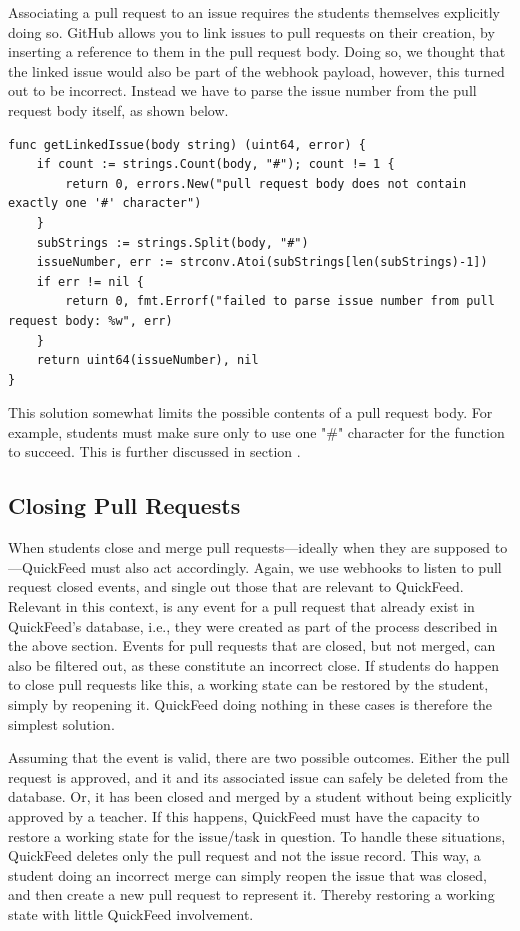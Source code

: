 Associating a pull request to an issue requires the students themselves explicitly doing so.
GitHub allows you to link issues to pull requests on their creation, by inserting a reference to them in the pull request body.
Doing so, we thought that the linked issue would also be part of the webhook payload, however, this turned out to be incorrect.
Instead we have to parse the issue number from the pull request body itself, as shown below.

\begin{lstlisting}[caption={The getLinkedIssue function}, language=Golang]
func getLinkedIssue(body string) (uint64, error) {
	if count := strings.Count(body, "#"); count != 1 {
		return 0, errors.New("pull request body does not contain exactly one '#' character")
	}
	subStrings := strings.Split(body, "#")
	issueNumber, err := strconv.Atoi(subStrings[len(subStrings)-1])
	if err != nil {
		return 0, fmt.Errorf("failed to parse issue number from pull request body: %w", err)
	}
	return uint64(issueNumber), nil
}
\end{lstlisting}

This solution somewhat limits the possible contents of a pull request body.
For example, students must make sure only to use one "\#" character for the function to succeed.
This is further discussed in section .%

\subsection{Closing Pull Requests}

When students close and merge pull requests---ideally when they are supposed to---QuickFeed must also act accordingly.
Again, we use webhooks to listen to pull request closed events, and single out those that are relevant to QuickFeed.
Relevant in this context, is any event for a pull request that already exist in QuickFeed's database, i.e., they were created as part of the process described in the above section.
Events for pull requests that are closed, but not merged, can also be filtered out, as these constitute an incorrect close.
If students do happen to close pull requests like this, a working state can be restored by the student, simply by reopening it.
QuickFeed doing nothing in these cases is therefore the simplest solution.

Assuming that the event is valid, there are two possible outcomes.
Either the pull request is approved, and it and its associated issue can safely be deleted from the database.
Or, it has been closed and merged by a student without being explicitly approved by a teacher.
If this happens, QuickFeed must have the capacity to restore a working state for the issue/task in question.
To handle these situations, QuickFeed deletes only the pull request and not the issue record.
This way, a student doing an incorrect merge can simply reopen the issue that was closed, and then create a new pull request to represent it.
Thereby restoring a working state with little QuickFeed involvement.

